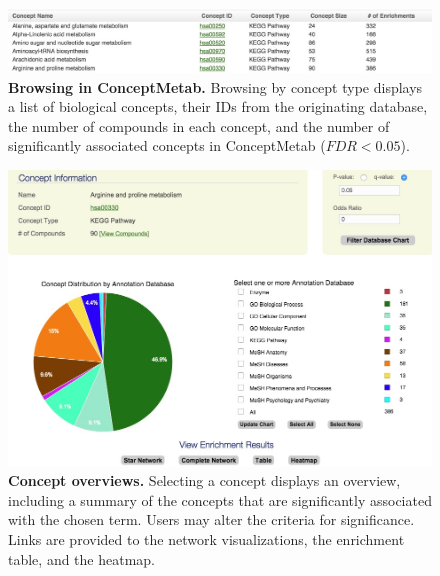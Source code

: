 \newpage

\begin{figure}[ht!]
\centering
\includegraphics[width=1\textwidth]{chap3figs/figure3_3.jpg}
\caption[Browsing in ConceptMetab.]
{
\textbf{Browsing in ConceptMetab.} Browsing by concept type displays a list of biological concepts, their IDs from the originating database, the number of compounds in each concept, and the number of significantly associated concepts in ConceptMetab ($FDR < 0.05$).
}
\label{chap3:fig:3}
\end{figure}

\newpage

\begin{figure}[ht!]
\centering
\includegraphics[width=1\textwidth]{chap3figs/figure3_4.jpg}
\caption[Concept overviews.]
{
\textbf{Concept overviews.} Selecting a concept displays an overview, including a summary of the concepts that are significantly associated with the chosen term. Users may alter the criteria for significance. Links are provided to the network visualizations, the enrichment table, and the heatmap.
}
\label{chap3:fig:4}
\end{figure}

